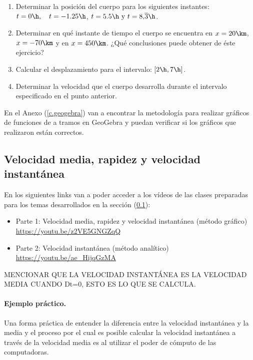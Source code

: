 \begin{enumerate}
\begin{enumerate}
      \item Determinar la posición del cuerpo para los siguientes instantes:
	$t=0\h, \quad t=-1.25\h$, $t=5.5\h \textrm{ y } t=8,\!\overline{3}\h$.
      \item Determinar en qué instante de tiempo el cuerpo se encuentra en
	$x=20\km$, $x=-70\km$ y en $x=450\km$. ¿Qué conclusiones puede obtener
	de éste ejercicio?
      \item Calcular el desplazamiento para el intervalo: $[2\h,7\h]$.
      \item Determinar la velocidad que el cuerpo desarrolla durante el
	intervalo especificado en el punto anterior.
    \end{enumerate}

\end{enumerate}
\normalsize

En el Anexo (\ref{c.geogebra}) van a encontrar la metodología para realizar
gráficos de funciones de a tramos en GeoGebra y puedan verificar si los gráficos
que realizaron están correctos.

\subsection{Velocidad media, rapidez y velocidad instantánea}
\label{c.vels}

En los siguientes links van a poder acceder a los vídeos de las clases
preparadas para los temas desarrollados en la sección (\ref{c.vels}):

\begin{itemize}
  \item Parte 1: Velocidad media, rapidez y velocidad instantánea (método
    gráfico)\\
    \href{https://youtu.be/z2VE5GNGZqQ}{https://youtu.be/z2VE5GNGZqQ}
  \item Parte 2: Velocidad instantánea (método analítico)\\
    \href{https://youtu.be/ae\_HijqGzMA}{https://youtu.be/ae\_HijqGzMA} \\
\end{itemize}


MENCIONAR QUE LA VELOCIDAD INSTANTÁNEA ES LA VELOCIDAD MEDIA CUANDO Dt=0, ESTO
ES LO QUE SE CALCULA.

\paragraph{Ejemplo práctico.}
Una forma práctica de entender la diferencia entre la velocidad instantánea y la
media y el proceso por el cual es posible calcular la velocidad instantánea a
través de la velocidad media es al utilizar el poder de cómputo de las
computadoras.

